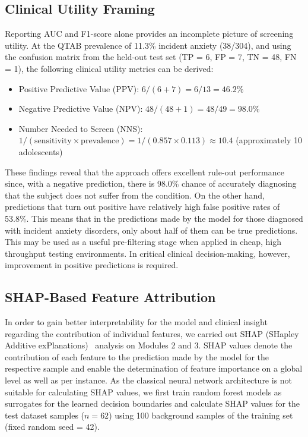 \documentclass[10pt,letterpaper]{article}
\newcommand{\hlpar}[1]{\leavevmode\colorbox{yellow!30}{\parbox{\dimexpr\linewidth-2\fboxsep\relax}{#1}}\vspace{2pt}}
\begin{document}
\subsection*{Clinical Utility Framing}

\hlpar{Reporting AUC and F1-score alone provides an incomplete picture of screening utility. At the QTAB prevalence of 11.3\% incident anxiety (38/304), and using the confusion matrix from the held-out test set (TP = 6, FP = 7, TN = 48, FN = 1), the following clinical utility metrics can be derived:}

\begin{itemize}
    \item \hlpar{Positive Predictive Value (PPV): $6/(6+7)=6/13=46.2\%$}
    \item \hlpar{Negative Predictive Value (NPV): $48/(48+1)=48/49=98.0\%$}
    \item \hlpar{Number Needed to Screen (NNS):
                 $1/(\mathrm{sensitivity}\times\mathrm{prevalence}) = 1/(0.857\times0.113)\approx10.4$ (approximately 10 adolescents)}
\end{itemize}

\hlpar{These findings reveal that the approach offers excellent rule-out performance since, with a negative prediction, there is 98.0\% chance of accurately diagnosing that the subject does not suffer from the condition. On the other hand, predictions that turn out positive have relatively high false positive rates of 53.8\%. This means that in the predictions made by the model for those diagnosed with incident anxiety disorders, only about half of them can be true predictions. This may be used as a useful pre-filtering stage when applied in cheap, high throughput testing environments. In critical clinical decision-making, however, improvement in positive predictions is required.}

\subsection*{SHAP-Based Feature Attribution}

\hlpar{In order to gain better interpretability for the model and clinical insight regarding the
contribution of individual features, we carried out SHAP (SHapley Additive
exPlanations)~\cite{ref_shap} analysis on Modules 2 and 3. SHAP values denote the
contribution of each feature to the prediction made by the model for the respective sample and
enable the determination of feature importance on a global level as well as per instance. As the
classical neural network architecture is not suitable for calculating SHAP values, we first train
random forest models as surrogates for the learned decision boundaries and calculate SHAP
values for the test dataset samples ($n = 62$) using 100 background samples of the training set
(fixed random seed = 42).}
\end{document}
